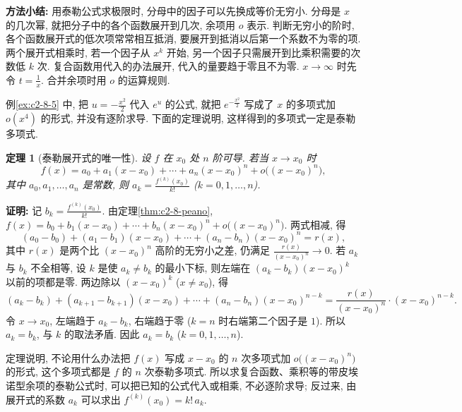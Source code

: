 \documentclass[UTF8,openany]{ctexbook}
\theoremstyle{chinesetextbook}
\newtheorem{theorem}{定理}[section]
\newenvironment{cnproof}{\par\indent\textbf{证明:} \ignorespaces}{\par}
\begin{document}
\par\indent\textbf{方法小结:} 用泰勒公式求极限时, 分母中的因子可以先换成等价无穷小. 分母是 $x$ 的几次幂, 就把分子中的各个函数展开到几次, 余项用 $o$ 表示. 判断无穷小的阶时, 各个函数展开式的低次项常常相互抵消, 要展开到抵消以后第一个系数不为零的项. 两个展开式相乘时, 若一个因子从 $x^k$ 开始, 另一个因子只需展开到比乘积需要的次数低 $k$ 次. 复合函数用代入的办法展开, 代入的量要趋于零且不为零. $x\to\infty$ 时先令 $\displaystyle t=\frac1x$. 合并余项时用 $o$ 的运算规则.

例\ref{ex:c2-8-5} 中, 把 $\displaystyle u=-\frac{x^2}2$ 代入 $e^u$ 的公式, 就把 $e^{-\frac{x^2}2}$ 写成了 $x$ 的多项式加 $o(x^4)$ 的形式, 并没有逐阶求导. 下面的定理说明, 这样得到的多项式一定是泰勒多项式.
\begin{theorem}[泰勒展开式的唯一性]\label{thm:c2-8-unique}
设 $f$ 在 $x_0$ 处 $n$ 阶可导. 若当 $x\to x_0$ 时
\[
f(x)=a_0+a_1(x-x_0)+\cdots+a_n(x-x_0)^n+o\bigl((x-x_0)^n\bigr),
\]
其中 $a_0,a_1,\ldots,a_n$ 是常数, 则 $\displaystyle a_k=\frac{f^{(k)}(x_0)}{k!}$ ($k=0,1,\ldots,n$).
\end{theorem}
\begin{cnproof}
记 $\displaystyle b_k=\frac{f^{(k)}(x_0)}{k!}$. 由定理\ref{thm:c2-8-peano}, $f(x)=b_0+b_1(x-x_0)+\cdots+b_n(x-x_0)^n+o\bigl((x-x_0)^n\bigr)$. 两式相减, 得
\[
(a_0-b_0)+(a_1-b_1)(x-x_0)+\cdots+(a_n-b_n)(x-x_0)^n=r(x),
\]
其中 $r(x)$ 是两个比 $(x-x_0)^n$ 高阶的无穷小之差, 仍满足 $\displaystyle\frac{r(x)}{(x-x_0)^n}\to0$. 若 $a_k$ 与 $b_k$ 不全相等, 设 $k$ 是使 $a_k\ne b_k$ 的最小下标, 则左端在 $(a_k-b_k)(x-x_0)^k$ 以前的项都是零. 两边除以 $(x-x_0)^k$ ($x\ne x_0$), 得
\[
(a_k-b_k)+(a_{k+1}-b_{k+1})(x-x_0)+\cdots+(a_n-b_n)(x-x_0)^{n-k}=\frac{r(x)}{(x-x_0)^n}\cdot(x-x_0)^{n-k}.
\]
令 $x\to x_0$, 左端趋于 $a_k-b_k$, 右端趋于零 ($k=n$ 时右端第二个因子是 $1$). 所以 $a_k=b_k$, 与 $k$ 的取法矛盾. 因此 $a_k=b_k$ ($k=0,1,\ldots,n$).
\end{cnproof}
定理说明, 不论用什么办法把 $f(x)$ 写成 $x-x_0$ 的 $n$ 次多项式加 $o\bigl((x-x_0)^n\bigr)$ 的形式, 这个多项式都是 $f$ 的 $n$ 次泰勒多项式. 所以求复合函数、乘积等的带皮埃诺型余项的泰勒公式时, 可以把已知的公式代入或相乘, 不必逐阶求导; 反过来, 由展开式的系数 $a_k$ 可以求出 $f^{(k)}(x_0)=k!\,a_k$.
\end{document}
